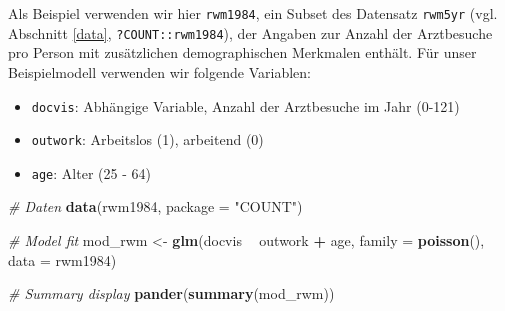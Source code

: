 \documentclass[ngerman,a4paper,]{scrartcl}
\newenvironment{Shaded}{\begin{snugshade}}{\end{snugshade}}
\newcommand{\CommentTok}[1]{\textcolor[rgb]{0.56,0.35,0.01}{\textit{#1}}}
\newcommand{\DataTypeTok}[1]{\textcolor[rgb]{0.13,0.29,0.53}{#1}}
\newcommand{\KeywordTok}[1]{\textcolor[rgb]{0.13,0.29,0.53}{\textbf{#1}}}
\newcommand{\NormalTok}[1]{#1}
\newcommand{\OperatorTok}[1]{\textcolor[rgb]{0.81,0.36,0.00}{\textbf{#1}}}
\newcommand{\StringTok}[1]{\textcolor[rgb]{0.31,0.60,0.02}{#1}}
\providecommand{\tightlist}{%
  \setlength{\itemsep}{0pt}\setlength{\parskip}{0pt}}
\theoremstyle{definition}
\theoremstyle{definition}
\theoremstyle{definition}
\theoremstyle{remark}
\begin{document}
Als Beispiel verwenden wir hier \texttt{rwm1984}, ein Subset des Datensatz \texttt{rwm5yr} (vgl. Abschnitt \ref{data}, \texttt{?COUNT::rwm1984}), der Angaben zur Anzahl der Arztbesuche pro Person mit zusätzlichen demographischen Merkmalen enthält. Für unser Beispielmodell verwenden wir folgende Variablen:

\begin{itemize}
\tightlist
\item
  \texttt{docvis}: Abhängige Variable, Anzahl der Arztbesuche im Jahr (0-121)
\item
  \texttt{outwork}: Arbeitslos (1), arbeitend (0)
\item
  \texttt{age}: Alter (25 - 64)
\end{itemize}

\begin{Shaded}
\begin{Highlighting}[]
\CommentTok{# Daten}
\KeywordTok{data}\NormalTok{(rwm1984, }\DataTypeTok{package =} \StringTok{"COUNT"}\NormalTok{)}

\CommentTok{# Model fit}
\NormalTok{mod_rwm <-}\StringTok{ }\KeywordTok{glm}\NormalTok{(docvis }\OperatorTok{~}\StringTok{ }\NormalTok{outwork }\OperatorTok{+}\StringTok{ }\NormalTok{age, }\DataTypeTok{family =} \KeywordTok{poisson}\NormalTok{(), }\DataTypeTok{data =}\NormalTok{ rwm1984)}

\CommentTok{# Summary display}
\KeywordTok{pander}\NormalTok{(}\KeywordTok{summary}\NormalTok{(mod_rwm))}
\end{Highlighting}
\end{Shaded}
\end{document}
